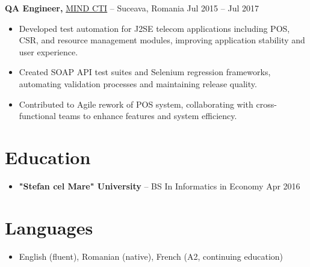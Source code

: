 \documentclass[11pt]{article}       %
\begin{document}
\textbf{QA Engineer,} \href{https://mindcti.com/}{MIND CTI} -- Suceava, Romania \hfill Jul 2015 – Jul 2017
\vspace{-9pt}

\begin{itemize}
    \item Developed test automation for J2SE telecom applications including POS, CSR, and resource management modules, improving application stability and user experience.
    \item Created SOAP API test suites and Selenium regression frameworks, automating validation processes and maintaining release quality.
    \item Contributed to Agile rework of POS system, collaborating with cross-functional teams to enhance features and system efficiency.
\end{itemize}

\vspace{-18.5pt}

\section*{Education}
\begin{itemize}
    \item \textbf{"Stefan cel Mare" University} -- BS In Informatics in Economy \hfill Apr 2016
\end{itemize}

\section*{Languages}
\begin{itemize}
    \item English (fluent), Romanian (native), French (A2, continuing education)
\end{itemize}
\end{document}
